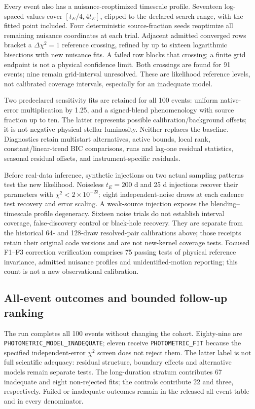 Every event also has a nuisance-reoptimized timescale profile. Seventeen
log-spaced values cover $[t_E/4,4t_E]$, clipped to the declared search
range, with the fitted point included. Four deterministic source-fraction
seeds reoptimize all remaining nuisance coordinates at each trial.
Adjacent admitted converged rows bracket a $\Delta\chi^2=1$ reference
crossing, refined by up to sixteen logarithmic bisections with new
nuisance fits. A failed row blocks that crossing; a finite grid endpoint
is not a physical confidence limit. Both crossings are found for 91
events; nine remain grid-interval unresolved. These are likelihood
reference levels, not calibrated coverage intervals, especially for an
inadequate model.

Two predeclared sensitivity fits are retained for all 100 events:
uniform native-error multiplication by 1.25, and a signed-blend
phenomenology with source fraction up to ten. The latter represents
possible calibration/background offsets; it is not negative physical
stellar luminosity. Neither replaces the baseline. Diagnostics retain
multistart alternatives, active bounds, local rank, constant/linear-trend
BIC comparisons, runs and lag-one residual statistics, seasonal residual
offsets, and instrument-specific residuals.

Before real-data inference, synthetic injections on two actual sampling
patterns test the new likelihood. Noiseless $t_E=200$ d and 25 d
injections recover their parameters with $\chi^2<2\times10^{-23}$;
eight independent-noise draws at each cadence test recovery and error
scaling. A weak-source injection exposes the blending--timescale profile
degeneracy. Sixteen noise trials do not establish interval coverage,
false-discovery control or black-hole recovery. They are separate from
the historical 64- and 128-draw resolved-pair calibrations above; those
receipts retain their original code versions and are not new-kernel
coverage tests. Focused F1--F3 correction verification comprises 75 passing
tests of physical reference invariance, admitted nuisance profiles and
unidentified-motion reporting; this count is not a new observational
calibration.

\subsection{All-event outcomes and bounded follow-up ranking}

The run completes all 100 events without changing the cohort. Eighty-nine
are \texttt{PHOTOMETRIC\_\allowbreak{}MODEL\_\allowbreak{}INADEQUATE}; eleven receive
\texttt{PHOTOMETRIC\_FIT} because the specified independent-error
$\chi^2$ screen does not reject them. The latter label is not full
scientific adequacy: residual structure, boundary effects and alternative
models remain separate tests. The long-duration stratum contributes
67 inadequate and eight non-rejected fits; the controls contribute 22
and three, respectively. Failed or inadequate outcomes remain in the
released all-event table and in every denominator.

